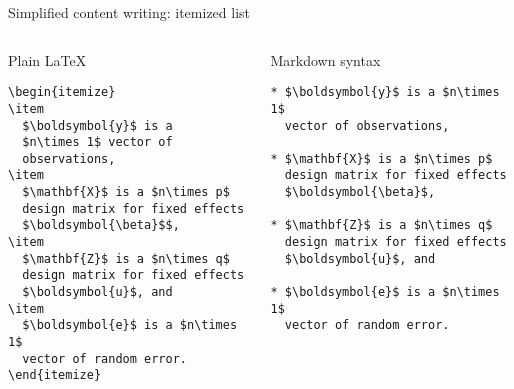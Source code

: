 \documentclass[10pt,aspectratio=169]{beamer}
\begin{document}
\begin{frame}[fragile]{Simplified content writing: itemized list}

\begin{columns}[T]
\begin{column}{0.48\textwidth}
\begin{block}{Plain \LaTeX}

\small

\begin{verbatim}
\begin{itemize}
\item 
  $\boldsymbol{y}$ is a 
  $n\times 1$ vector of 
  observations,
\item
  $\mathbf{X}$ is a $n\times p$ 
  design matrix for fixed effects
  $\boldsymbol{\beta}$$,
\item
  $\mathbf{Z}$ is a $n\times q$ 
  design matrix for fixed effects
  $\boldsymbol{u}$, and
\item
  $\boldsymbol{e}$ is a $n\times 1$ 
  vector of random error.
\end{itemize}
\end{verbatim}

\end{block}
\end{column}

\begin{column}{0.48\textwidth}
\begin{block}{Markdown syntax}

\small

\vspace{0.5cm}

\begin{verbatim}
* $\boldsymbol{y}$ is a $n\times 1$ 
  vector of observations,
  
* $\mathbf{X}$ is a $n\times p$ 
  design matrix for fixed effects 
  $\boldsymbol{\beta}$,
  
* $\mathbf{Z}$ is a $n\times q$ 
  design matrix for fixed effects 
  $\boldsymbol{u}$, and
  
* $\boldsymbol{e}$ is a $n\times 1$ 
  vector of random error.
\end{verbatim}

\end{block}
\end{column}
\end{columns}

\end{frame}
\end{document}
